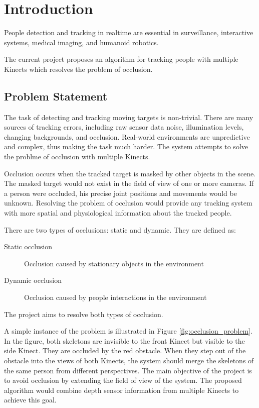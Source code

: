 


\chapter{Introduction}

\label{chapter:introduction}

People detection and tracking in realtime are essential in surveillance, interactive systems, medical imaging, and humanoid robotics.

The current project proposes an algorithm for tracking people with multiple Kinects which resolves the problem of occlusion.

\section{Problem Statement}
\label{sec:introduction_problem_statement}

The task of detecting and tracking moving targets is non-trivial. There are many sources of tracking errors, including raw sensor data noise, illumination levels, changing backgrounds, and occlusion. Real-world environments are unpredictive and complex, thus making the task much harder. The system attempts to solve the problme of occlusion with multiple Kinects.

Occlusion occurs when the tracked target is masked by other objects in the scene. The masked target would not exist in the field of view of one or more cameras. If a person were occluded, his precise joint positions and movements would be unknown. Resolving the problem of occlusion would provide any tracking system with more spatial and physiological information about the tracked people.

There are two types of occlusions: static and dynamic. They are defined as:

\begin{description}
  \item[Static occlusion] Occlusion caused by stationary objects in the environment 
  \item[Dynamic occlusion] Occlusion caused by people interactions in the environment
\end{description}

The project aims to resolve both types of occlusion.

A simple instance of the problem is illustrated in Figure \ref{fig:occlusion_problem}. In the figure, both skeletons are invisible to the front Kinect but visible to the side Kinect. They are occluded by the red obstacle. When they step out of the obstacle into the views of both Kinects, the system should merge the skeletons of the same person from different perspectives. The main objective of the project is to avoid occlusion by extending the field of view of the system. The proposed algorithm would combine depth sensor information from multiple Kinects to achieve this goal.

